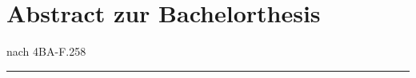 \cleardoublepage
\section{Abstract zur Bachelorthesis}
    \begin{minipage}{0.5\columnwidth}
        
    \end{minipage}
    \begin{minipage}{0.45\columnwidth}
        \begin{flushright}
        {\small nach 4BA-F.258\\}
        \end{flushright}
    \end{minipage}
    \par\noindent\rule{\columnwidth}{.5pt}
    
